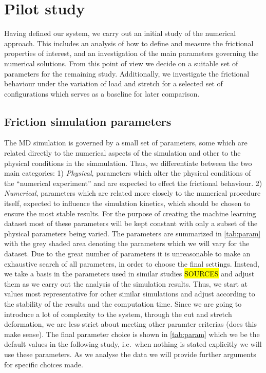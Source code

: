 


\chapter{Pilot study}
Having defined our system, we carry out an initial study of the numerical approach. This includes an analysis of how to define and measure the frictional properties of interest, and an investigation of the main parameters governing the numerical solutions. From this point of view we decide on a suitable set of parameters for the remaining study. Additionally, we investigate the frictional behaviour under the variation of load and stretch for a selected set of configurations which serves as a baseline for later comparison. 


\section{Friction simulation parameters}
The \acrshort{MD} simulation is governed by a small set of parameters, some
which are related directly to the numerical aspects of the simulation and other
to the physical conditions in the simmulation. Thus, we differentiate between
the two main categories: 1) \textit{Physical}, parameters which alter the
physical conditions of the ``numerical experiment'' and are expected to effect
the frictional behaviour. 2) \textit{Numerical}, parameters which are related
more closely to the numerical procedure itself, expected to influence the
simulation kinetics, which should be chosen to ensure the most stable results.
For the purpose of creating the machine learning dataset most of these
parameters will be kept constant with only a subset of the physical parameters
being varied. The parameters are summarized in \cref{tab:param} with the grey
shaded area denoting the parameters which we will vary for the dataset. Due to
the great number of parameters it is unreasonable to make an exhaustive search
of all parameters, in order to choose the final settings. Instead, we take a
basis in the parameters used in similar studies \hl{SOURCES} and adjust them as
we carry out the analysis of the simulation results. Thus, we start at values
most representative for other similar simulations and adjust according to the
stability of the results and the computation time. Since we are going to
introduce a lot of complexity to the system, through the cut and stretch
deformation, we are less strict about meeting other paramter criterias (does
this make sense). The final parameter choice is shown in \cref{tab:param} which
we be the default values in the following study, i.e.\ when nothing is stated explicitly we will use these parameters. As we analyse the data we will provide further arguments for specific choices made.


